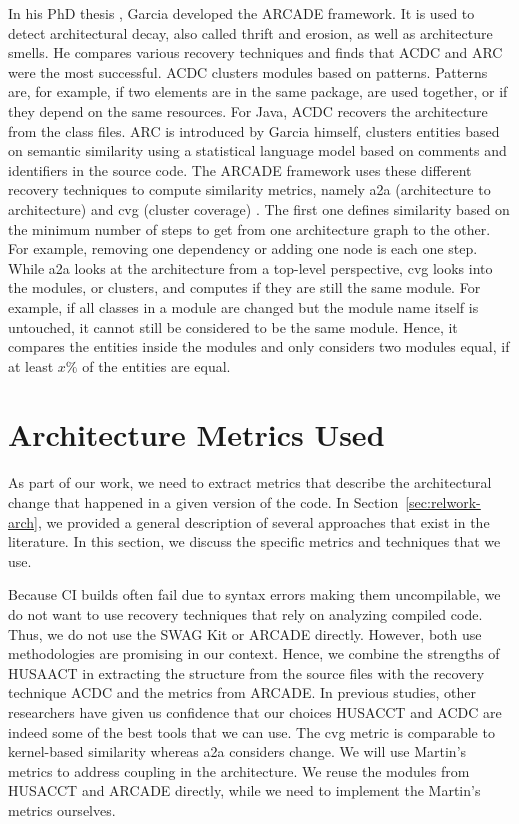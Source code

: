 \documentclass[sigplan, anonymous, review]{acmart}
\begin{document}
In his PhD thesis \cite{arcade-thesis}, Garcia developed the ARCADE framework. It is used to detect architectural decay, also called thrift and erosion, as well as architecture smells. He compares various recovery techniques \cite{arcRec-comparison} and finds that ACDC \cite{ACDC} and ARC were the most successful. 
ACDC clusters modules based on patterns. Patterns are, for example, if two elements are in the same package, are used together, or if they depend on the same resources. For Java, ACDC recovers the architecture from the class files. ARC is introduced by Garcia himself, clusters entities based on semantic similarity using a statistical language model based on comments and identifiers in the source code.
The ARCADE framework uses these different recovery techniques to compute similarity metrics, namely a2a (architecture to architecture) and cvg (cluster coverage) \cite{Arcade}. 
The first one defines similarity based on the minimum number of steps to get from one architecture graph to the other. For example, removing one dependency or adding one node is each one step. While a2a looks at the architecture from a top-level perspective, cvg looks into the modules, or clusters, and computes if they are still the same module. For example, if all classes in a module are changed but the module name itself is untouched, it cannot still be considered to be the same module. Hence, it compares the entities inside the modules and only considers two modules equal, if at least $x \%$ of the entities are equal.

\section{Architecture Metrics Used} \label{sec:Metrics}

As part of our work, we need to extract metrics that describe the architectural change that happened in a given version of the code. 
In Section~\ref{sec:relwork-arch}, we provided a general description of several approaches that exist in the literature.
In this section, we discuss the specific metrics and techniques that we use.

Because CI builds often fail due to syntax errors making them uncompilable, we do not want to use recovery techniques that rely on analyzing compiled code. Thus, we do not use the SWAG Kit or ARCADE directly.
However, both use methodologies are promising in our context. Hence, we combine the strengths of HUSAACT in extracting the structure from the source files with the recovery technique ACDC and the metrics from ARCADE. 
In previous studies, other researchers \cite{MScSteffen, arcRec-comparison} have given us confidence that our choices HUSACCT and ACDC are indeed some of the best tools that we can use.
The cvg metric is comparable to kernel-based similarity whereas a2a considers change. We will use Martin's metrics to address coupling in the architecture. We reuse the modules from HUSACCT and ARCADE directly, while we need to implement the Martin's metrics ourselves. 
\end{document}

